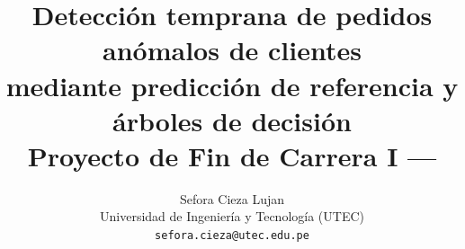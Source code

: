 \title{Detección temprana de pedidos anómalos de clientes\\
mediante predicción de referencia y árboles de decisión\\[0.3em]
\large Proyecto de Fin de Carrera I --- \EntregableTitulo}
\author{\small Sefora Cieza Lujan\\
\small Universidad de Ingeniería y Tecnología (UTEC)\\
\small\texttt{sefora.cieza@utec.edu.pe}}
\date{\FechaInforme}
\maketitle

\begin{abstract}
\ResumenInforme
\end{abstract}

\tableofcontents
